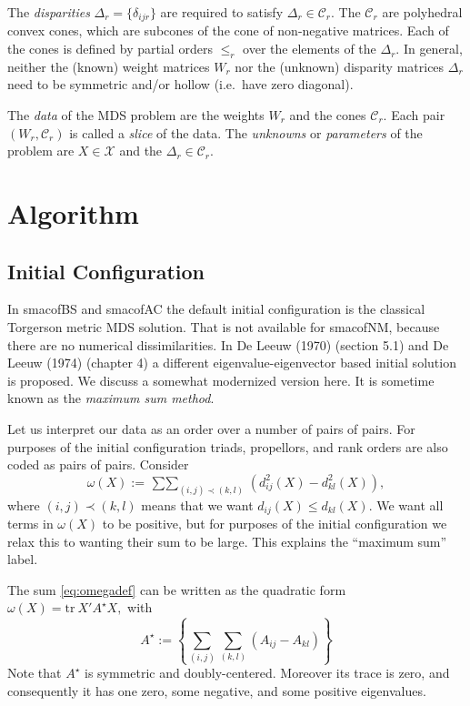 \documentclass[
  12pt,
]{article}
\begin{document}
The \emph{disparities} \(\Delta_r=\{\delta_{ijr}\}\) are required to satisfy \(\Delta_r\in\mathcal{C}_r\). The \(\mathcal{C}_r\) are polyhedral convex cones, which are subcones of the cone of non-negative matrices. Each of the cones is defined by partial orders \(\leq_r\) over the elements of the \(\Delta_r\). In general, neither the (known) weight matrices \(W_r\) nor the (unknown) disparity matrices \(\Delta_r\) need to be symmetric and/or hollow (i.e.~have zero diagonal).

The \emph{data} of the MDS problem are the weights \(W_r\) and the cones \(\mathcal{C}_r\). Each pair \((W_r,\mathcal{C}_r)\) is called a \emph{slice} of the data. The \emph{unknowns} or \emph{parameters} of the problem are \(X\in\mathcal{X}\) and the \(\Delta_r\in\mathcal{C}_r\).

\section{Algorithm}\label{algorithm}

\subsection{Initial Configuration}\label{initial-configuration}

In smacofBS and smacofAC the default initial configuration is the
classical Torgerson metric MDS solution. That is not available for
smacofNM, because there are no numerical dissimilarities. In
De Leeuw (1970) (section 5.1) and De Leeuw (1974) (chapter 4) a different eigenvalue-eigenvector based initial solution is proposed. We discuss a somewhat modernized version here. It is sometime known as the
\emph{maximum sum method}.

Let us interpret our data as an order over a number of pairs of pairs. For purposes of the initial configuration triads, propellors, and rank orders are also coded as pairs of pairs.
Consider
\begin{equation}
\omega(X):=\mathop{\sum\sum}_{(i,j)\prec(k,l)}(d_{ij}^2(X)-d_{kl}^2(X)),
\label{eq:omegadef}
\end{equation}
where \((i,j)\prec(k,l)\) means that we want \(d_{ij}(X)\leq d_{kl}(X)\).
We want all terms in \(\omega(X)\) to be positive, but for purposes of
the initial configuration we relax this to wanting their sum to be
large. This explains the ``maximum sum'' label.

The sum \eqref{eq:omegadef} can be written as the quadratic form
\(\omega(X)=\text{tr}\ X'A^\star X,\)
with
\begin{equation}
A^\star:=\left\{\sum_{(i,j)}\sum_{(k,l)}(A_{ij}-A_{kl})\right\} 
\label{eq:astardef}
\end{equation}
Note that \(A^\star\) is symmetric and doubly-centered. Moreover
its trace is zero, and consequently it has one zero, some negative,
and some positive eigenvalues.
\end{document}
